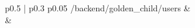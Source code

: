 \documentclass[conference]{IEEEtran}
\begin{document}
\begin{enumerate}
\begin{flushleft}
\begin{supertabular}{p{0.5\linewidth} | p{0.3\linewidth} p{0.05\linewidth}}
        \midrule
        /backend/golden\_child/users & \\
        \midrule
         & \\
        \end{supertabular}
    \end{flushleft}
\end{enumerate}
\end{document}
